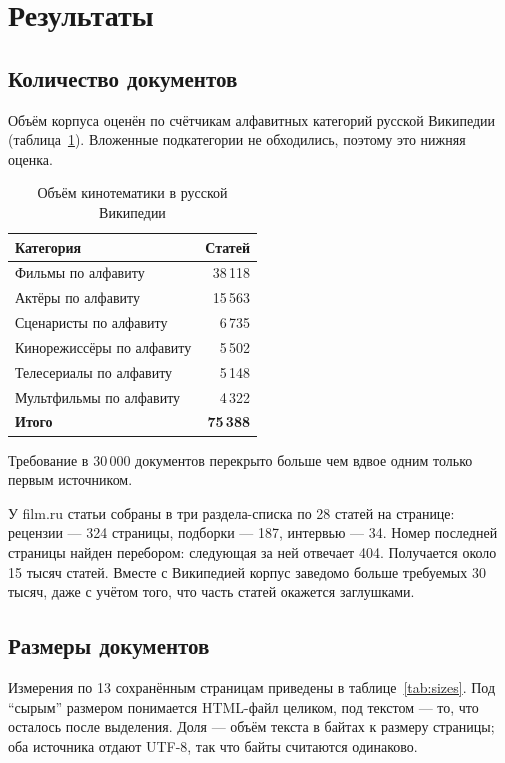 \section{Результаты}

\subsection*{Количество документов}

Объём корпуса оценён по счётчикам алфавитных категорий русской Википедии
(таблица~\ref{tab:cats}). Вложенные подкатегории не обходились, поэтому это нижняя оценка.

\begin{table}[h]
\centering
\begin{tabular}{|l|r|}
\hline
\textbf{Категория} & \textbf{Статей} \\
\hline
Фильмы по алфавиту & 38\,118 \\
Актёры по алфавиту & 15\,563 \\
Сценаристы по алфавиту & 6\,735 \\
Кинорежиссёры по алфавиту & 5\,502 \\
Телесериалы по алфавиту & 5\,148 \\
Мультфильмы по алфавиту & 4\,322 \\
\hline
\textbf{Итого} & \textbf{75\,388} \\
\hline
\end{tabular}
\caption{Объём кинотематики в русской Википедии}
\label{tab:cats}
\end{table}

Требование в 30\,000 документов перекрыто больше чем вдвое одним только первым
источником.

У film.ru статьи собраны в три раздела-списка по 28 статей на странице: рецензии ---
324 страницы, подборки --- 187, интервью --- 34. Номер последней страницы найден
перебором: следующая за ней отвечает 404. Получается около 15 тысяч статей. Вместе с
Википедией корпус заведомо больше требуемых 30 тысяч, даже с учётом того, что часть
статей окажется заглушками.

\subsection*{Размеры документов}

Измерения по 13 сохранённым страницам приведены в таблице~\ref{tab:sizes}. Под
\enquote{сырым} размером понимается HTML-файл целиком, под текстом --- то, что осталось
после выделения. Доля --- объём текста в байтах к размеру страницы; оба источника
отдают UTF-8, так что байты считаются одинаково.

